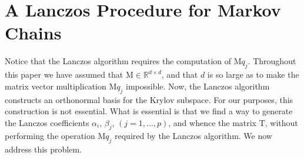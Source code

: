 \documentclass[12pt,letterpaper]{report}
\theoremstyle{plain}
\theoremstyle{definition}
\theoremstyle{remark}
\numberwithin{theorem}{chapter}
\numberwithin{claim}{chapter}
\numberwithin{equation}{chapter}
\numberwithin{conjecture}{chapter}
\newcommand\R{\ensuremath{\mathbb{R}}}
\newcommand\M{\ensuremath{\mathrm{M}}}
\newcommand\T{\ensuremath{\mathrm{T}}}
\newcommand\<{\ensuremath{\langle}}
\renewcommand\>{\ensuremath{\rangle}}
\begin{document}
\section{A Lanczos Procedure for Markov Chains}
\label{sec:lancz-proc-mark}
Notice that the Lanczos algorithm requires the computation of $\M q_j$. Throughout this
paper we have assumed that $\M \in \R^{d\times d}$, and that $d$ is so large as
to make the matrix vector multiplication $\M q_j$ impossible. Now, the Lanczos
algorithm constructs an orthonormal basis for the Krylov subspace. For our
purposes, this construction is not essential. What is essential is that we find
a way to generate the Lanczos coefficients $\alpha_i$, $\beta_j$, $(j = 1,\dots, p)$, and
whence the matrix $\T$, without performing the operation $\M q_j$ required by the
Lanczos algorithm. We now address this problem.
\end{document}
